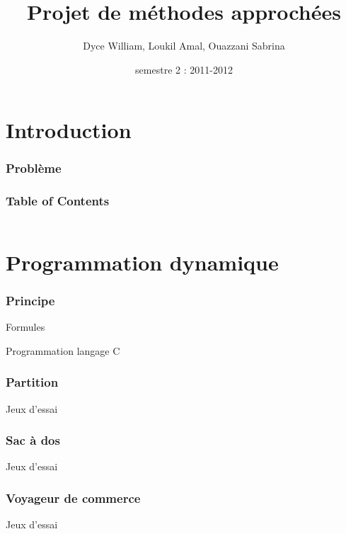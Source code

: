 \documentclass[french]{beamer}
\title{Projet de méthodes approchées}
\institute{M1 informatique UM2}
\author{Dyce William, Loukil Amal, Ouazzani Sabrina}
\date{semestre 2 : 2011-2012}
\begin{document}
\begin{frame}
\titlepage
\end{frame}

\section{Introduction}

\begin{frame}
\frametitle{Problème}
\end{frame}

\begin{frame}
\frametitle{Table of Contents}
\begin{columns}
\begin{column}[]{7cm}
\tableofcontents
\end{column}
\begin{column}[]{2cm}
\end{column}
\end{columns}
\end{frame}

\section{Programmation dynamique}

\begin{frame}
\frametitle{Principe}
\begin{alertblock}{Formules}
\end{alertblock}

\begin{block}{Programmation}
langage C
\end{block}

\end{frame}


\begin{frame}
\frametitle{Partition}
\begin{block}{Jeux d'essai}

\end{block}
\end{frame}


\begin{frame}
\frametitle{Sac à dos}
\begin{block}{Jeux d'essai}

\end{block}
\end{frame}

\begin{frame}
\frametitle{Voyageur de commerce}
\begin{block}{Jeux d'essai}

\end{block}
\end{frame}
\end{document}
